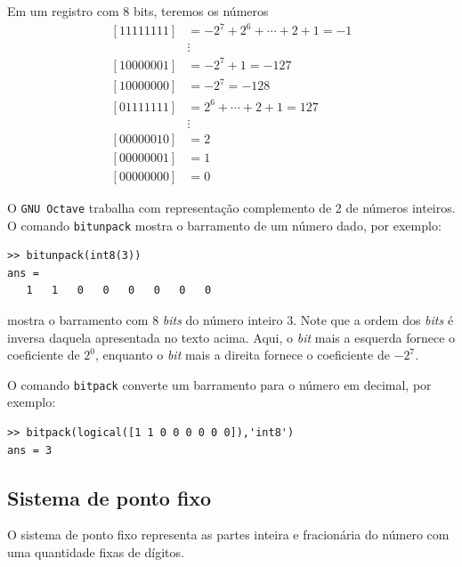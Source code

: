 \begin{ex}
Em um registro com $8$ bits, teremos os números
\begin{equation}
  \begin{split}
    [11111111] &= -2^7+2^{6}+\cdots+2+1=-1\\
    &\vdots   \\
    [10000001] &= -2^7+1 = -127 \\
    [10000000] &= -2^7   = -128 \\
    [01111111] &= 2^6+\cdots+2+1=127 \\
    &\vdots   \\
    [00000010] &= 2 \\
    [00000001] &= 1 \\
    [00000000] &= 0
  \end{split}
\end{equation}

\ifisoctave
O \verb+GNU Octave+ trabalha com representação complemento de 2 de números inteiros. O comando \verb+bitunpack+ mostra o barramento de um número dado, por exemplo:
\begin{verbatim}
>> bitunpack(int8(3))
ans =
   1   1   0   0   0   0   0   0
\end{verbatim}
mostra o barramento com $8$ \emph{bits} do número inteiro $3$. Note que a ordem dos \emph{bits} é inversa daquela apresentada no texto acima. Aqui, o \emph{bit} mais a esquerda fornece o coeficiente de $2^0$, enquanto o \emph{bit} mais a direita fornece o coeficiente de $-2^7$.

O comando \verb+bitpack+ converte um barramento para o número em decimal, por exemplo:
\begin{verbatim}
>> bitpack(logical([1 1 0 0 0 0 0 0]),'int8')
ans = 3
\end{verbatim}
\fi
\end{ex}

\subsection{Sistema de ponto fixo}

O sistema de ponto fixo representa as partes inteira e fracionária do número com uma quantidade fixas de dígitos.

